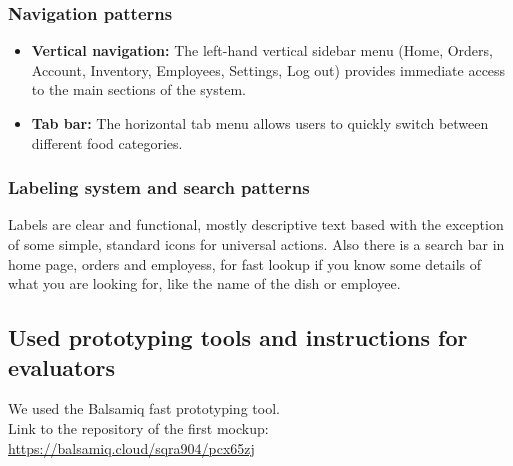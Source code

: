 \documentclass{article}
\begin{document}
\subsubsection{Navigation patterns}
\begin{itemize}
    \item \textbf{Vertical navigation:} The left-hand vertical sidebar menu (Home, Orders, Account, Inventory, Employees, Settings, Log out) provides immediate access to the main sections of the system.
    \item \textbf{Tab bar:} The horizontal tab menu allows users to quickly switch between different food categories.
\end{itemize}

\subsubsection{Labeling system and search patterns}
Labels are clear and functional, mostly descriptive text based with the exception of some simple, standard icons for universal actions. %
Also there is a search bar in home page, orders and employess, for fast lookup if you know some details of what you are looking for, like the name of the dish or employee.
\subsection{Used prototyping tools and instructions for evaluators}
We used the Balsamiq fast prototyping tool.\\ Link to the repository of the first mockup: \url{https://balsamiq.cloud/sqra904/pcx65zj}
\end{document}
